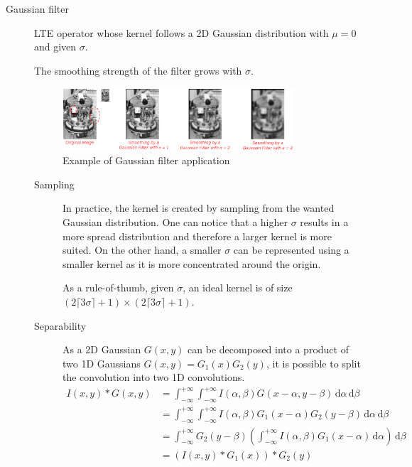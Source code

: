 \begin{description}
    \item[Gaussian filter] 
        LTE operator whose kernel follows a 2D Gaussian distribution with $\mu=0$ and given $\sigma$.

        \begin{remark}
            The smoothing strength of the filter grows with $\sigma$.
        \end{remark}

        \begin{figure}[H]
            \centering
            \includegraphics[width=0.85\textwidth]{./img/_gaussian_filter_example.pdf}
            \caption{Example of Gaussian filter application}
        \end{figure}

        \begin{description}
            \item[Sampling]
                In practice, the kernel is created by sampling from the wanted Gaussian distribution.
                One can notice that a higher $\sigma$ results in a more spread distribution and therefore a larger kernel is more suited.
                On the other hand, a smaller $\sigma$ can be represented using a smaller kernel as it is more concentrated around the origin.

                As a rule-of-thumb, given $\sigma$, an ideal kernel is of size $(2\lceil 3\sigma \rceil + 1) \times (2\lceil 3\sigma \rceil + 1)$.

            \item[Separability]
                As a 2D Gaussian $G(x, y)$ can be decomposed into a product of two 1D Gaussians $G(x, y) = G_1(x)G_2(y)$,
                it is possible to split the convolution into two 1D convolutions.
                \[ 
                    \begin{split}
                        I(x, y) * G(x, y) &= \int_{-\infty}^{+\infty}\int_{-\infty}^{+\infty} I(\alpha, \beta) G(x-\alpha, y-\beta) \,\text{d}\alpha\,\text{d}\beta \\
                            &= \int_{-\infty}^{+\infty}\int_{-\infty}^{+\infty} I(\alpha, \beta) G_1(x-\alpha)G_2(y-\beta) \,\text{d}\alpha\,\text{d}\beta \\
                            &= \int_{-\infty}^{+\infty} G_2(y-\beta) \left( \int_{-\infty}^{+\infty} I(\alpha, \beta) G_1(x-\alpha) \,\text{d}\alpha \right) \,\text{d}\beta \\
                            &= (I(x, y) * G_1(x)) * G_2(y)
                    \end{split}
                \]


\end{description}
\end{description}
